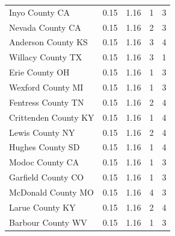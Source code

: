 \documentclass[]{article}
\begin{document}
\begin{table}
\begin{tabular}[t]{lrrrr}
\hspace{1em}Inyo County CA & 0.15 & 1.16 & 1 & 3\\
\hspace{1em}Nevada County CA & 0.15 & 1.16 & 2 & 3\\
\hspace{1em}Anderson County KS & 0.15 & 1.16 & 3 & 4\\
\hspace{1em}Willacy County TX & 0.15 & 1.16 & 3 & 1\\
\hspace{1em}Erie County OH & 0.15 & 1.16 & 1 & 3\\
\hspace{1em}Wexford County MI & 0.15 & 1.16 & 1 & 3\\
\hspace{1em}Fentress County TN & 0.15 & 1.16 & 2 & 4\\
\hspace{1em}Crittenden County KY & 0.15 & 1.16 & 1 & 4\\
\hspace{1em}Lewis County NY & 0.15 & 1.16 & 2 & 4\\
\hspace{1em}Hughes County SD & 0.15 & 1.16 & 1 & 4\\
\hspace{1em}Modoc County CA & 0.15 & 1.16 & 1 & 3\\
\hspace{1em}Garfield County CO & 0.15 & 1.16 & 1 & 3\\
\hspace{1em}McDonald County MO & 0.15 & 1.16 & 4 & 3\\
\hspace{1em}Larue County KY & 0.15 & 1.16 & 2 & 4\\
\hspace{1em}Barbour County WV & 0.15 & 1.16 & 1 & 3\\
\bottomrule
\end{tabular}
\end{table}
\end{document}
